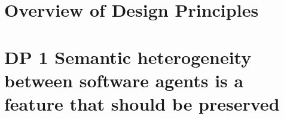 \documentclass[sort&compress,preprint,authoryear,3p,twocolumn]{elsarticle}
\begin{document}
\begin{frontmatter}
{%


\begin{keyword}
semantic interoperability\sep software
architectures\sep semantics\sep interoperability\sep design principles
\end{keyword}

\end{frontmatter}

\linenumbers



\hypertarget{overview-of-design-principles}{%
\section{Overview of Design
Principles}\label{overview-of-design-principles}}

\hypertarget{dp-1-semantic-heterogeneity-between-software-agents-is-a-feature-that-should-be-preserved}{%
\section{DP 1 Semantic heterogeneity between software agents is a
feature that should be
preserved}\label{dp-1-semantic-heterogeneity-between-software-agents-is-a-feature-that-should-be-preserved}}
\end{document}
